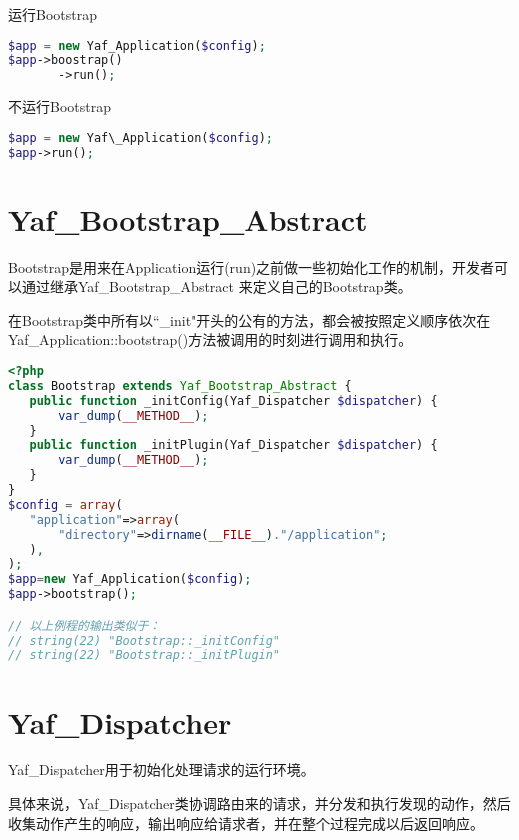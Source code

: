 \begin{compactitem}
\item 运行Bootstrap


\begin{lstlisting}[language=PHP]
$app = new Yaf_Application($config);
$app->boostrap()
       ->run();
\end{lstlisting}

\item 不运行Bootstrap

\begin{lstlisting}[language=PHP]
$app = new Yaf\_Application($config);
$app->run();
\end{lstlisting}

\end{compactitem}

\chapter{Yaf\_Bootstrap\_Abstract}

Bootstrap是用来在Application运行(run)之前做一些初始化工作的机制，开发者可以通过继承Yaf\_Bootstrap\_Abstract 来定义自己的Bootstrap类。

在Bootstrap类中所有以``\_init"开头的公有的方法，都会被按照定义顺序依次在Yaf\_Application::bootstrap()方法被调用的时刻进行调用和执行。



\begin{lstlisting}[language=PHP]
<?php
class Bootstrap extends Yaf_Bootstrap_Abstract {
   public function _initConfig(Yaf_Dispatcher $dispatcher) {
       var_dump(__METHOD__);
   }
   public function _initPlugin(Yaf_Dispatcher $dispatcher) {
       var_dump(__METHOD__);
   }
}
$config = array(
   "application"=>array(
       "directory"=>dirname(__FILE__)."/application";
   ),
);
$app=new Yaf_Application($config);
$app->bootstrap();

// 以上例程的输出类似于：
// string(22) "Bootstrap::_initConfig"
// string(22) "Bootstrap::_initPlugin"
\end{lstlisting}





\chapter{Yaf\_Dispatcher}

Yaf\_Dispatcher用于初始化处理请求的运行环境。

具体来说，Yaf\_Dispatcher类协调路由来的请求，并分发和执行发现的动作，然后收集动作产生的响应，输出响应给请求者，并在整个过程完成以后返回响应。

